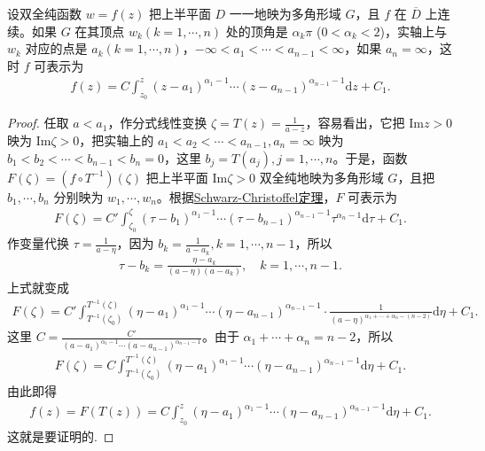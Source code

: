 \documentclass[../../main.tex]{subfiles}%
\begin{document}
\begin{theorem}
设双全纯函数 \(w=f(z)\) 把上半平面 \(D\) 一一地映为多角形域 \(G\)，且 \(f\) 在 \(\overline{D}\) 上连续。如果 \(G\) 在其顶点 \(w_k(k=1,\cdots,n)\) 处的顶角是 \(\alpha_k\pi\) (\(0<\alpha_k<2\))，实轴上与 \(w_k\) 对应的点是 \(a_k(k=1,\cdots,n)\)，\(-\infty < a_1 < \cdots < a_{n-1} < \infty\)，如果 \(a_n=\infty\)，这时 \(f\) 可表示为
\begin{align}
f(z) = C \int_{z_0}^{z} (z-a_1)^{\alpha_1-1} \cdots (z-a_{n-1})^{\alpha_{n-1}-1} \mathrm{d}z + C_1. \label{eq:8}
\end{align}
\end{theorem}
\begin{proof}
任取 \(a<a_1\)，作分式线性变换 \(\zeta=T(z)=\frac{1}{a-z}\)，容易看出，它把 \(\mathrm{Im}z>0\) 映为 \(\mathrm{Im}\zeta>0\)，把实轴上的 \(a_1<a_2<\cdots<a_{n-1}, a_n=\infty\) 映为 \(b_1<b_2<\cdots<b_{n-1}<b_n=0\)，这里 \(b_j=T(a_j), j=1,\cdots,n\)。于是，函数 \(F(\zeta)=(f \circ T^{-1})(\zeta)\) 把上半平面 \(\mathrm{Im}\zeta>0\) 双全纯地映为多角形域 \(G\)，且把 \(b_1,\cdots,b_n\) 分别映为 \(w_1,\cdots,w_n\)。根据\hyperref[theorem:Schwarz-Christoffel定理]{Schwarz-Christoffel定理}，\(F\) 可表示为
\begin{align*}
F(\zeta) = C' \int_{\zeta_0}^{\zeta} (\tau-b_1)^{\alpha_1-1} \cdots (\tau-b_{n-1})^{\alpha_{n-1}-1} \tau^{\alpha_n-1} \mathrm{d}\tau + C_1.
\end{align*}
作变量代换 \(\tau=\frac{1}{a-\eta}\)，因为 \(b_k=\frac{1}{a-a_k}, k=1,\cdots,n-1\)，所以
\begin{align*}
\tau-b_k = \frac{\eta-a_k}{(a-\eta)(a-a_k)}, \quad k=1,\cdots,n-1.
\end{align*}
上式就变成
\begin{align*}
F(\zeta) = C' \int_{T^{-1}(\zeta_0)}^{T^{-1}(\zeta)} (\eta-a_1)^{\alpha_1-1} \cdots (\eta-a_{n-1})^{\alpha_{n-1}-1} \cdot \frac{1}{(a-\eta)^{\alpha_1+\cdots+\alpha_n-(n-2)}} \mathrm{d}\eta + C_1.
\end{align*}
这里 \(C=\frac{C'}{(a-a_1)^{\alpha_1-1}\cdots(a-a_{n-1})^{\alpha_{n-1}-1}}\)。由于 \(\alpha_1+\cdots+\alpha_n=n-2\)，所以
\begin{align*}
F(\zeta) = C \int_{T^{-1}(\zeta_0)}^{T^{-1}(\zeta)} (\eta-a_1)^{\alpha_1-1} \cdots (\eta-a_{n-1})^{\alpha_{n-1}-1} \mathrm{d}\eta + C_1.
\end{align*}
由此即得
\begin{align*}
f(z)=F(T(z)) = C \int_{z_0}^{z} (\eta-a_1)^{\alpha_1-1} \cdots (\eta-a_{n-1})^{\alpha_{n-1}-1} \mathrm{d}\eta + C_1.
\end{align*}
这就是要证明的.
\end{proof}
\end{document}
